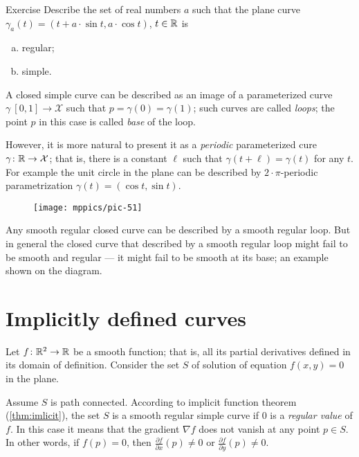 \begin{thm}{Exercise}\label{ex:cycloid}
Describe the set of real numbers $a$
such that the plane curve $\gamma_a(t)= (t+a\cdot \sin t,a\cdot \cos t)$, $t\in\mathbb{R}$ is
\begin{enumerate}[(a)]
\item regular;
\item simple.
\end{enumerate}

\end{thm}

A closed simple curve can be described as an image of a parameterized curve $\gamma\: [0,1]\to \mathcal{X}$ such that $p=\gamma(0)=\gamma(1)$;
such curves are called \emph{loops}; 
the point $p$ in this case is called \emph{base} of the loop.

However, it is more natural to present it as a \emph{periodic} parameterized cure $\gamma\colon \mathbb{R}\to \mathcal{X}$; that is, there is a constant $\ell$ such that $\gamma(t+\ell)=\gamma(t)$ for any $t$.
For example the unit circle in the plane can be described by $2{\cdot}\pi$-periodic parametrization $\gamma(t)=(\cos t,\sin t)$.

\begin{wrapfigure}{r}{17 mm}
\vskip-5mm
\centering
\texttt{[image: mppics/pic-51]}
\end{wrapfigure}

Any smooth regular closed curve can be described by a smooth regular loop.
But in general the closed curve that described by a smooth regular loop might fail to be smooth and regular --- it might fail to be smooth at its base; an example shown on the diagram.


\section*{Implicitly defined curves}

Let $f\colon\mathbb{R}^2\to \mathbb{R}$ be a smooth function; 
that is, all its partial derivatives defined in its domain of definition.
Consider the set $S$ of solution of equation $f(x,y)=0$ in the plane.

Assume $S$ is path connected.
According to implicit function theorem (\ref{thm:imlicit}), the set $S$ is a smooth regular simple curve if $0$ is a \emph{regular value} of $f$.
In this case it means that the gradient $\nabla f$ does not vanish at any point $p\in S$.
In other words, if $f(p)=0$, then  $\tfrac{\partial f}{\partial x}(p)\ne 0$ or $\tfrac{\partial f}{\partial y}(p)\ne 0$.

